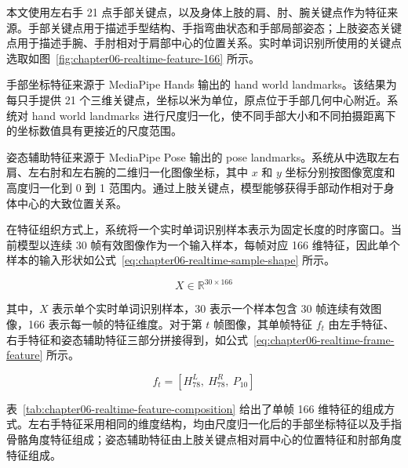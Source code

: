 本文使用左右手 21 点手部关键点，以及身体上肢的肩、肘、腕关键点作为特征来源。手部关键点用于描述手型结构、手指弯曲状态和手部局部姿态；上肢姿态关键点用于描述手腕、手肘相对于肩部中心的位置关系。实时单词识别所使用的关键点选取如图~\ref{fig:chapter06-realtime-feature-166} 所示。


手部坐标特征来源于 MediaPipe Hands 输出的 hand world landmarks。该结果为每只手提供 21 个三维关键点，坐标以米为单位，原点位于手部几何中心附近。系统对 hand world landmarks 进行尺度归一化，使不同手部大小和不同拍摄距离下的坐标数值具有更接近的尺度范围。

姿态辅助特征来源于 MediaPipe Pose 输出的 pose landmarks。系统从中选取左右肩、左右肘和左右腕的二维归一化图像坐标，其中 $x$ 和 $y$ 坐标分别按图像宽度和高度归一化到 0 到 1 范围内。通过上肢关键点，模型能够获得手部动作相对于身体中心的大致位置关系。

在特征组织方式上，系统将一个实时单词识别样本表示为固定长度的时序窗口。当前模型以连续 30 帧有效图像作为一个输入样本，每帧对应 166 维特征，因此单个样本的输入形状如公式~\ref{eq:chapter06-realtime-sample-shape} 所示。

\begin{equation}
X \in \mathbb{R}^{30\times166}
\label{eq:chapter06-realtime-sample-shape}
\end{equation}

其中，$X$ 表示单个实时单词识别样本，30 表示一个样本包含 30 帧连续有效图像，166 表示每一帧的特征维度。对于第 $t$ 帧图像，其单帧特征 $f_t$ 由左手特征、右手特征和姿态辅助特征三部分拼接得到，如公式~\ref{eq:chapter06-realtime-frame-feature} 所示。

\begin{equation}
f_t = [H^L_{78},\ H^R_{78},\ P_{10}]
\label{eq:chapter06-realtime-frame-feature}
\end{equation}

表~\ref{tab:chapter06-realtime-feature-composition} 给出了单帧 166 维特征的组成方式。左右手特征采用相同的维度结构，均由尺度归一化后的手部坐标特征以及手指骨骼角度特征组成；姿态辅助特征由上肢关键点相对肩中心的位置特征和肘部角度特征组成。

